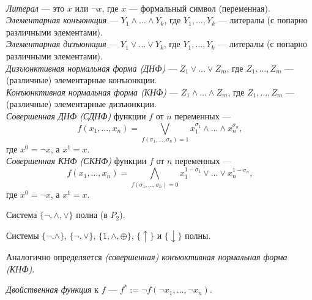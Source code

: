 \documentclass[12pt,a4paper]{article}
\begin{document}
    \begin{definition}\ \\
        \emph{Литерал} --- это $x$ или $\neg x$, где $x$ --- формальный символ (переменная).\\
        \emph{Элементарная конъюнкция} --- $Y_1 \wedge \dots \wedge Y_k$, где $Y_1, \dots, Y_k$ --- литералы (с попарно различными элементами).\\
        \emph{Элементарная дизъюнкция} --- $Y_1 \vee \dots \vee Y_k$, где $Y_1, \dots, Y_k$ --- литералы (с попарно различными элементами).\\
        \emph{Дизъюнктивная нормальная форма (ДНФ)} --- $Z_1 \vee \dots \vee Z_m$, где $Z_1, \dots, Z_m$ --- (различные) элементарные конъюнкции.\\
        \emph{Конъюнктивная нормальная форма (КНФ)} --- $Z_1 \wedge \dots \wedge Z_m$, где $Z_1, \dots, Z_m$ --- (различные) элементарные дизъюнкции.\\
        \emph{Совершенная ДНФ (СДНФ)} функции $f$ от $n$ переменных --- \[f(x_1, \dots, x_n)=\bigvee_{f(\sigma_1, \dots, \sigma_n)=1} x_1^{\sigma_1} \wedge \dots \wedge x_n^{\sigma_n},\]
        где $x^0 = \neg x$, а $x^1 = x$.\\
        \emph{Совершенная КНФ (СКНФ)} функции $f$ от $n$ переменных --- \[f(x_1, \dots, x_n)=\bigwedge_{f(\sigma_1, \dots, \sigma_n)=0} x_1^{1-\sigma_1} \vee \dots \vee x_n^{1-\sigma_n},\]
        где $x^0 = \neg x$, а $x^1 = x$.
    \end{definition}

    \begin{statement}
        Система $\{\neg, \wedge, \vee\}$ полна (в $P_2$).
    \end{statement}

    \begin{corollary}
        Системы $\{\neg. \wedge\}$, $\{\neg, \vee\}$, $\{1, \wedge, \oplus\}$, $\{\uparrow\}$ и $\{\downarrow\}$ полны.
    \end{corollary}

    \begin{definition}
        Аналогично определяется \emph{(совершенная) конъюктивная нормальная форма (КНФ)}.
    \end{definition}

    \begin{definition}
        \emph{Двойственная функция} к $f$ --- $f^* := \neg f(\neg x_1, \dots, \neg x_n)$.
    \end{definition}
\end{document}
